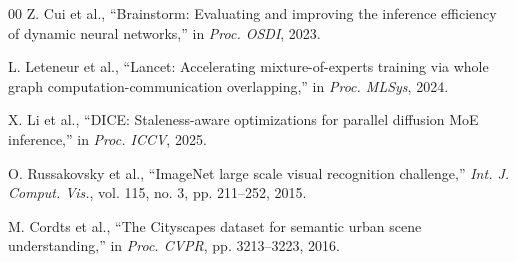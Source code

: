 \documentclass[conference]{IEEEtran}
\begin{document}
\begin{thebibliography}{00}
Z. Cui et al., ``Brainstorm: Evaluating and improving the inference efficiency of dynamic neural networks,'' in \textit{Proc. OSDI}, 2023.

L. Leteneur et al., ``Lancet: Accelerating mixture-of-experts training via whole graph computation-communication overlapping,'' in \textit{Proc. MLSys}, 2024.

X. Li et al., ``DICE: Staleness-aware optimizations for parallel diffusion MoE inference,'' in \textit{Proc. ICCV}, 2025.

O. Russakovsky et al., ``ImageNet large scale visual recognition challenge,'' \textit{Int. J. Comput. Vis.}, vol. 115, no. 3, pp. 211--252, 2015.

M. Cordts et al., ``The Cityscapes dataset for semantic urban scene understanding,'' in \textit{Proc. CVPR}, pp. 3213--3223, 2016.

\end{thebibliography}
\end{document}
